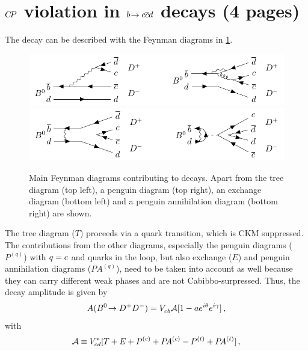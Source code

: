 
\section{\texorpdfstring{${C\!P}$}{CP} violation in \texorpdfstring{${b}\!\rightarrow {\ensuremath{c}}{\ensuremath{\overline {{c}}}}{\ensuremath{d}}$}{bToccbard} decays (4 pages)}
\label{sec:cpviolation:btoccbard}

The decay \BdToDD can be described with the Feynman diagrams in
\cref{fig:cpviolation:feynmandiagrams_bdtodd}.
\begin{figure}[htb]
\centering
\includegraphics[width=\textwidth]{03-CPViolation/tikz/pdf/BdToDD_Feynmans.pdf}
\includegraphics[width=\textwidth]{03-CPViolation/tikz/pdf/BdToDD_Feynmans2.pdf}
\caption{Main Feynman diagrams contributing to \BdToDD decays. Apart from the
tree diagram (top left), a penguin diagram (top right), an exchange diagram
(bottom left) and a penguin annihilation diagram (bottom right) are shown.}
\label{fig:cpviolation:feynmandiagrams_bdtodd}
\end{figure}
The tree diagram ($T$) proceeds via a \bToccbard quark transition, which is
CKM suppressed. The contributions from the other diagrams, especially the
penguin diagrams ($P^{(q)}$) with $q = {c}$ and \tquark quarks in the
loop, but also exchange ($E$) and penguin annihilation diagrams
($P\!A^{(q)}$), need to be taken into account as well because they can carry
different weak phases and are not Cabibbo-surpressed. Thus, the decay
amplitude is given by~\cite{Fleischer1999,Fleischer2007,Bel:2015wha}
\begin{align}
	A({{B}^0}\!\rightarrow {\ensuremath{{D}^+}}{\ensuremath{{D}^-}}) = {V_{{c}{b}}^{}} \mathcal{A}[1 - ae^{i\theta}e^{i\gamma}]\,,
\end{align}
with
\begin{align}
	\mathcal{A} \equiv {\ensuremath{V_{{c}{d}}^\ast}}[T + E + {P^{(c)} + P\!A^{(c)}} - {P^{(t)} + P\!A^{(t)}}]\,,
\end{align}
